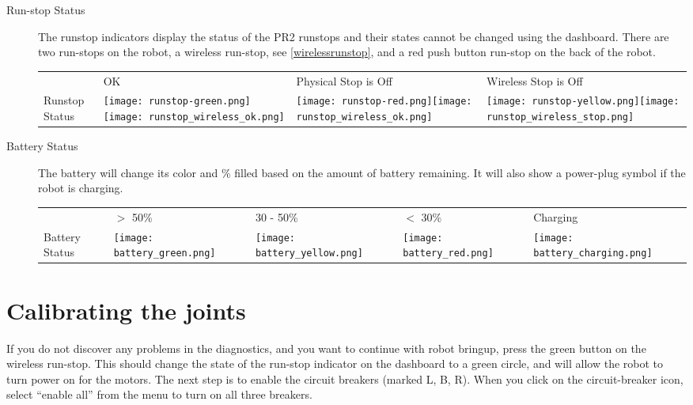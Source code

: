\begin{description}
\item[Run-stop Status] The runstop indicators display the status of the PR2 runstops and their states cannot be changed using the dashboard. 
There are two run-stops on the robot, a wireless run-stop, see \ref{wirelessrunstop}, and a red push button run-stop on the back of the robot.\\

    \begin{tabular}{m{2.6cm}SSS}
     & OK & Physical Stop is Off & Wireless Stop is Off\\
    Runstop Status & \texttt{[image: runstop-green.png]}\texttt{[image: runstop\_wireless\_ok.png]}&
                     \texttt{[image: runstop-red.png]}\texttt{[image: runstop\_wireless\_ok.png]}&
                     \texttt{[image: runstop-yellow.png]}\texttt{[image: runstop\_wireless\_stop.png]}\\
   \end{tabular}

\item[Battery Status]
The battery will change its color and \% filled based on the amount of battery remaining. It will also show a power-plug symbol if the robot is charging.
                                                                                                                      
    \begin{tabular}{m{2.5cm}SSSS}
     & $>$ 50\% & 30 - 50\% & $<$ 30\% & Charging\\
    Battery Status & \texttt{[image: battery\_green.png]}&
                     \texttt{[image: battery\_yellow.png]}&
                     \texttt{[image: battery\_red.png]}&
                     \texttt{[image: battery\_charging.png]}\\
   \end{tabular}


\end{description}

\section{Calibrating the joints}
If you do not discover any problems in the diagnostics, and you want to continue with robot bringup, press the green 
button on the wireless run-stop.  This should change the state of the run-stop indicator on the dashboard to a green 
circle, and will allow the robot to turn power on for the motors.  The next step is to enable the circuit breakers 
(marked L, B, R).  When you click on the circuit-breaker icon, select ``enable all'' from the menu to turn on all 
three breakers.

